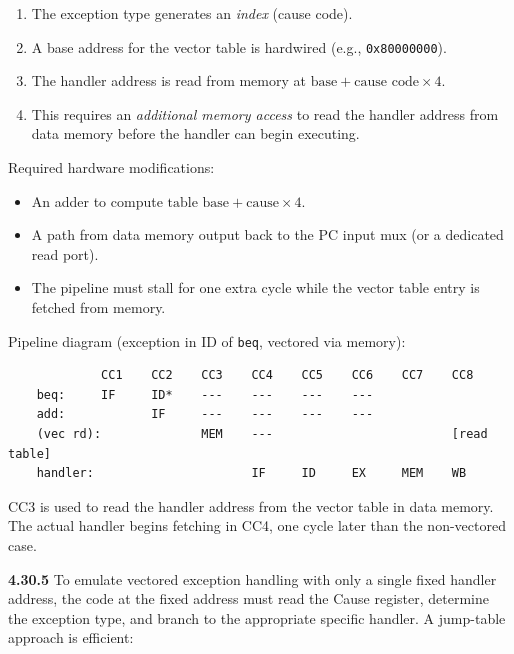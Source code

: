 \begin{enumerate}
\item The exception type generates an \emph{index} (cause code).
\item A base address for the vector table is hardwired (e.g., \texttt{0x80000000}).
\item The handler address is read from memory at
      $\text{base} + \text{cause code} \times 4$.
\item This requires an \emph{additional memory access} to read the handler
      address from data memory before the handler can begin executing.
\end{enumerate}

\noindent Required hardware modifications:
\begin{itemize}
\item An adder to compute $\text{table base} + \text{cause} \times 4$.
\item A path from data memory output back to the PC input mux (or a dedicated
      read port).
\item The pipeline must stall for one extra cycle while the vector table entry
      is fetched from memory.
\end{itemize}

\noindent Pipeline diagram (exception in ID of \texttt{beq}, vectored via memory):

\begin{verbatim}
             CC1    CC2    CC3    CC4    CC5    CC6    CC7    CC8
    beq:     IF     ID*    ---    ---    ---    ---
    add:            IF     ---    ---    ---    ---
    (vec rd):              MEM    ---                         [read table]
    handler:                      IF     ID     EX     MEM    WB
\end{verbatim}

\noindent CC3 is used to read the handler address from the vector table in
data memory.  The actual handler begins fetching in CC4, one cycle later
than the non-vectored case.

\medskip\noindent\textbf{4.30.5}
To emulate vectored exception handling with only a single fixed handler
address, the code at the fixed address must read the Cause register,
determine the exception type, and branch to the appropriate specific handler.
A jump-table approach is efficient:

